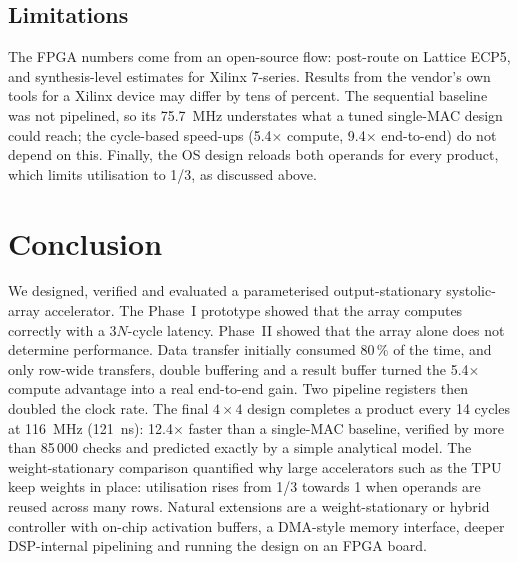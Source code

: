 \subsection{Limitations}
The FPGA numbers come from an open-source flow: post-route on Lattice ECP5,
and synthesis-level estimates for Xilinx 7-series. Results from the
vendor's own tools for a Xilinx device may differ by tens of percent. The sequential baseline was not pipelined, so its 75.7~MHz
understates what a tuned single-MAC design could reach; the cycle-based
speed-ups (5.4$\times$ compute, 9.4$\times$ end-to-end) do not depend on
this. Finally, the OS design reloads both operands for every product,
which limits utilisation to 1/3, as discussed above.

\section{Conclusion}
We designed, verified and evaluated a parameterised output-stationary
systolic-array accelerator. The Phase~I prototype showed that the array
computes correctly with a $3N$-cycle latency. Phase~II showed that the
array alone does not determine performance. Data transfer initially
consumed 80\,\% of the time, and only row-wide transfers, double buffering
and a result buffer turned the 5.4$\times$ compute advantage into a real
end-to-end gain. Two pipeline registers then doubled the clock rate. The
final $4\times4$ design completes a product every 14 cycles at 116~MHz
(121~ns): 12.4$\times$ faster than a single-MAC baseline, verified by more
than 85\,000 checks and predicted exactly by a simple analytical model.
The weight-stationary comparison quantified why large accelerators such as
the TPU keep weights in place: utilisation rises from 1/3 towards 1 when
operands are reused across many rows. Natural extensions are a
weight-stationary or hybrid controller with on-chip activation buffers, a
DMA-style memory interface, deeper DSP-internal pipelining and running the
design on an FPGA board.
